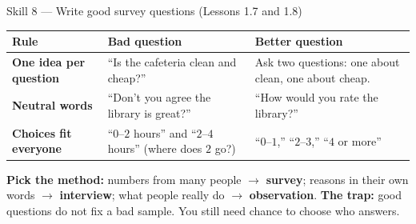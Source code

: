 \documentclass[10pt]{article}
\begin{document}
\vspace{3pt}
\boxguard[16]
\begin{notesbox}{Skill 8 --- Write good survey questions (Lessons 1.7 and 1.8)}
\small
\renewcommand{\arraystretch}{1.2}
\begin{tabularx}{\linewidth}{@{} >{\bfseries}p{3.0cm} X X @{}}
\rowcolor{frost}
\textbf{Rule} & \textbf{Bad question} & \textbf{Better question} \\
\midrule
One idea per question & ``Is the cafeteria clean and cheap?'' & Ask two questions: one about
  clean, one about cheap. \\
Neutral words & ``Don't you agree the library is great?'' & ``How would you rate the
  library?'' \\
Choices fit everyone & ``$0$--$2$ hours'' and ``$2$--$4$ hours'' (where does $2$ go?) &
  ``$0$--$1$,'' ``$2$--$3$,'' ``$4$ or more'' \\
\end{tabularx}

\vspace{3pt}
\textbf{Pick the method:} numbers from many people $\rightarrow$ \textbf{survey}; reasons in
their own words $\rightarrow$ \textbf{interview}; what people really do $\rightarrow$
\textbf{observation}. \textbf{The trap:} good questions do not fix a bad sample. You still need chance to choose who
answers.
\end{notesbox}
\end{document}
